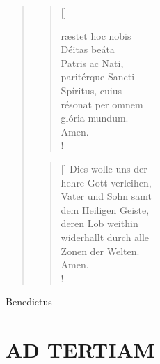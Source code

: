 \begin{quote}
\begin{multicols}{2}
\begin{verse}[\versewidth]

{\normalsize{ræstet hoc nobis\\
Déitas beáta\\
Patris ac Nati,\\
paritérque Sancti\\
Spíritus, cuius\\
résonat per omnem\\
glória mundum.\\
Amen.\\!}}
\end{verse}

\columnbreak

\begin{verse}[\versewidth]
{\normalsize\rm{ Dies wolle uns der\\ 
hehre Gott verleihen,\\
Vater und Sohn samt\\
dem Heiligen Geiste,\\
deren Lob weithin\\
widerhallt durch alle\\ 
Zonen der Welten.\\
Amen.\\!}}

\end{verse}
\end{multicols}

\end{quote}

\begin{flushleft}


\medskip
{\rm{
}}
\end{flushleft}

\medskip





 Benedictus 

\medskip

\section[HORA TERTIA]{AD TERTIAM}


